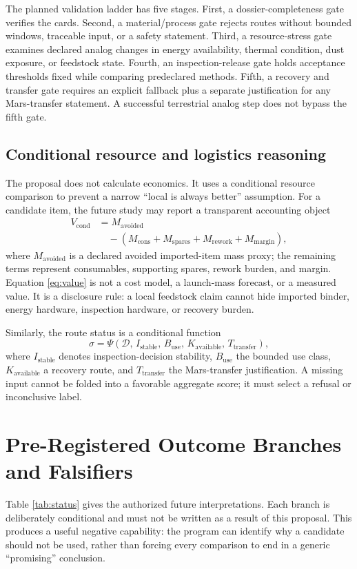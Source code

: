 \documentclass[conference]{../../../../Conference-LaTeX-template_10-17-19/IEEEtran}
\begin{document}
The planned validation ladder has five stages. First, a dossier-completeness gate verifies the cards. Second, a material/process gate rejects routes without bounded windows, traceable input, or a safety statement. Third, a resource-stress gate examines declared analog changes in energy availability, thermal condition, dust exposure, or feedstock state. Fourth, an inspection-release gate holds acceptance thresholds fixed while comparing predeclared methods. Fifth, a recovery and transfer gate requires an explicit fallback plus a separate justification for any Mars-transfer statement. A successful terrestrial analog step does not bypass the fifth gate.

\subsection{Conditional resource and logistics reasoning}
The proposal does not calculate economics. It uses a conditional resource comparison to prevent a narrow ``local is always better'' assumption. For a candidate item, the future study may report a transparent accounting object
\begin{align}
V_{\mathrm{cond}} &= M_{\mathrm{avoided}} \nonumber\\
&\quad -\left(M_{\mathrm{cons}}+M_{\mathrm{spares}}+M_{\mathrm{rework}}+M_{\mathrm{margin}}\right),
\label{eq:value}
\end{align}
where $M_{\mathrm{avoided}}$ is a declared avoided imported-item mass proxy; the remaining terms represent consumables, supporting spares, rework burden, and margin. Equation \eqref{eq:value} is not a cost model, a launch-mass forecast, or a measured value. It is a disclosure rule: a local feedstock claim cannot hide imported binder, energy hardware, inspection hardware, or recovery burden.

Similarly, the route status is a conditional function
\begin{equation}
\sigma = \Psi\left(\mathcal{D},\, I_{\mathrm{stable}},\, B_{\mathrm{use}},\, K_{\mathrm{available}},\, T_{\mathrm{transfer}}\right),
\label{eq:status}
\end{equation}
where $I_{\mathrm{stable}}$ denotes inspection-decision stability, $B_{\mathrm{use}}$ the bounded use class, $K_{\mathrm{available}}$ a recovery route, and $T_{\mathrm{transfer}}$ the Mars-transfer justification. A missing input cannot be folded into a favorable aggregate score; it must select a refusal or inconclusive label.

\section{Pre-Registered Outcome Branches and Falsifiers}
Table \ref{tab:status} gives the authorized future interpretations. Each branch is deliberately conditional and must not be written as a result of this proposal. This produces a useful negative capability: the program can identify why a candidate should not be used, rather than forcing every comparison to end in a generic ``promising'' conclusion.
\end{document}
